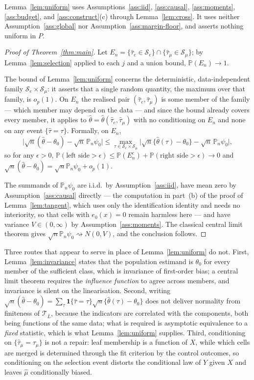 \documentclass[11pt]{article}
\theoremstyle{plain}
\theoremstyle{definition}
\theoremstyle{remark}
\newcommand{\PP}{\mathbb{P}}
\newcommand{\Pn}{\mathbb{P}_n}
\newcommand{\cT}{\mathcal{T}}
\newcommand{\cS}{\mathcal{S}}
\newcommand{\ez}{e_0}
\newcommand{\mhat}{\widehat{\mu}}
\newcommand{\that}{\widehat{\tau}}
\newcommand{\thetahat}{\widehat{\theta}}
\begin{document}
\noindent Lemma~\ref{lem:uniform} uses Assumptions~\ref{ass:iid},
\ref{ass:causal}, \ref{ass:moments}, \ref{ass:budget}, and
\ref{ass:construct}(c) through Lemma~\ref{lem:cross}. It uses neither
Assumption~\ref{ass:global} nor Assumption~\ref{ass:margin-floor}, and asserts
nothing uniform in $P$.

\begin{proof}[Proof of Theorem~\ref{thm:main}]
Let $E_n=\{\that_e\in\cS_e\}\cap\{\that_\mu\in\cS_\mu\}$; by
Lemma~\ref{lem:selection} applied to each $j$ and a union bound,
$\PP(E_n)\to1$.

The bound of Lemma~\ref{lem:uniform} concerns the deterministic,
data-independent family $\cS_e\times\cS_\mu$: it asserts that a single random
quantity, the maximum over that family, is $o_p(1)$. On $E_n$ the realised pair
$(\that_e,\that_\mu)$ is some member of the family --- which member may depend on
the data --- and since the bound already covers every member, it applies to
$\thetahat=\thetahat(\that_e,\that_\mu)$ with no conditioning on $E_n$ and none
on any event $\{\that=\tau\}$. Formally, on $E_n$,
\[
  \bigl\lvert\sqrt n(\thetahat-\theta_0)-\sqrt n\,\Pn\psi_0\bigr\rvert
  \le\max_{\tau\in\cS_e\times\cS_\mu}
   \bigl\lvert\sqrt n\{\thetahat(\tau)-\theta_0\}-\sqrt n\,\Pn\psi_0\bigr\rvert ,
\]
so for any $\epsilon>0$,
$\PP(\text{left side}>\epsilon)\le\PP(E_n^c)+\PP(\text{right side}>\epsilon)\to0$
and $\sqrt n(\thetahat-\theta_0)=\sqrt n\Pn\psi_0+o_p(1)$.

The summands of $\Pn\psi_0$ are i.i.d.\ by Assumption~\ref{ass:iid}, have mean
zero by Assumption~\ref{ass:causal} directly --- the computation in
part~(b) of the proof of Lemma~\ref{lem:tangent}, which uses only the
identification identity and needs no interiority, so that cells with $\ez(x)=0$
remain harmless here --- and have
variance $V\in(0,\infty)$ by Assumption~\ref{ass:moments}. The classical central
limit theorem gives $\sqrt n\Pn\psi_0\rightsquigarrow N(0,V)$, and the
conclusion follows.
\end{proof}

\noindent Three routes that appear to serve in place of
Lemma~\ref{lem:uniform} do not. First, Lemma~\ref{lem:invariance} states that the
population estimand is $\theta_0$ for every member of the sufficient class, which
is invariance of first-order bias; a central limit theorem requires the
\emph{influence function} to agree across members, and invariance is silent on
the linearisation. Second, writing
$\sqrt n(\thetahat-\theta_0)=\sum_\tau\mathbf1\{\that=\tau\}
\sqrt n\{\thetahat(\tau)-\theta_0\}$ does not deliver normality from finiteness
of $\cT_{\bar L}$, because the indicators are correlated with the components,
both being functions of the same data; what is required is asymptotic equivalence
to a \emph{fixed} statistic, which is what Lemma~\ref{lem:uniform} supplies.
Third, conditioning on $\{\that_\mu=\tau_\mu\}$ is not a repair: leaf membership
is a function of $X$, while which cells are merged is determined through the fit
criterion by the control outcomes, so conditioning on the selection event
distorts the conditional law of $Y$ given $X$ and leaves $\mhat$ conditionally
biased.
\end{document}

